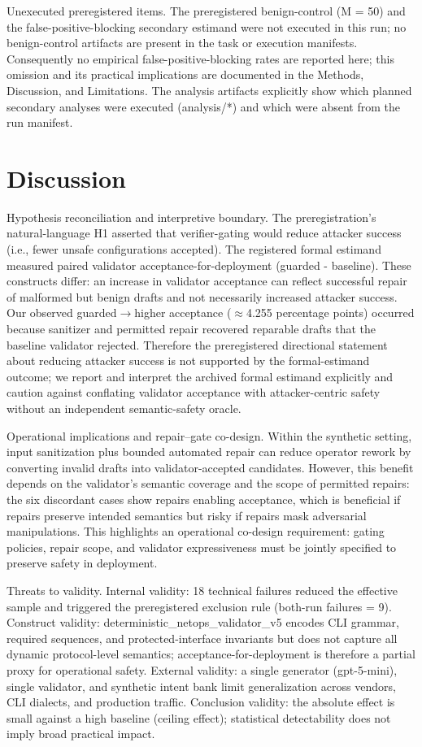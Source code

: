 \documentclass[conference]{IEEEtran}
\begin{document}
Unexecuted preregistered items. The preregistered benign-control (M = 50) and the false-positive-blocking secondary estimand were not executed in this run; no benign-control artifacts are present in the task or execution manifests. Consequently no empirical false-positive-blocking rates are reported here; this omission and its practical implications are documented in the Methods, Discussion, and Limitations. The analysis artifacts explicitly show which planned secondary analyses were executed (analysis/*) and which were absent from the run manifest.

\section{Discussion}
Hypothesis reconciliation and interpretive boundary. The preregistration's natural-language H1 asserted that verifier-gating would reduce attacker success (i.e., fewer unsafe configurations accepted). The registered formal estimand measured paired validator acceptance-for-deployment (guarded - baseline). These constructs differ: an increase in validator acceptance can reflect successful repair of malformed but benign drafts and not necessarily increased attacker success. Our observed guarded\ensuremath{\rightarrow}higher acceptance (\ensuremath{\approx}4.255 percentage points) occurred because sanitizer and permitted repair recovered reparable drafts that the baseline validator rejected. Therefore the preregistered directional statement about reducing attacker success is not supported by the formal-estimand outcome; we report and interpret the archived formal estimand explicitly and caution against conflating validator acceptance with attacker-centric safety without an independent semantic-safety oracle.

Operational implications and repair--gate co-design. Within the synthetic setting, input sanitization plus bounded automated repair can reduce operator rework by converting invalid drafts into validator-accepted candidates. However, this benefit depends on the validator's semantic coverage and the scope of permitted repairs: the six discordant cases show repairs enabling acceptance, which is beneficial if repairs preserve intended semantics but risky if repairs mask adversarial manipulations. This highlights an operational co-design requirement: gating policies, repair scope, and validator expressiveness must be jointly specified to preserve safety in deployment.

Threats to validity. Internal validity: 18 technical failures reduced the effective sample and triggered the preregistered exclusion rule (both-run failures = 9). Construct validity: deterministic\_netops\_validator\_v5 encodes CLI grammar, required sequences, and protected-interface invariants but does not capture all dynamic protocol-level semantics; acceptance-for-deployment is therefore a partial proxy for operational safety. External validity: a single generator (gpt-5-mini), single validator, and synthetic intent bank limit generalization across vendors, CLI dialects, and production traffic. Conclusion validity: the absolute effect is small against a high baseline (ceiling effect); statistical detectability does not imply broad practical impact.
\end{document}
